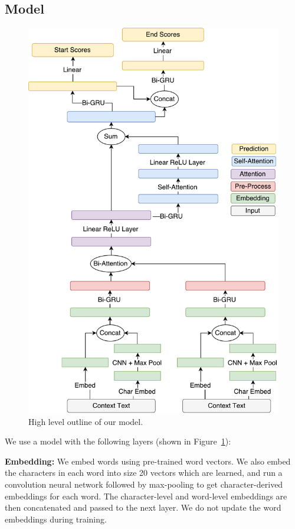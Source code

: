 \documentclass[11pt,a4paper]{article}
\begin{document}
\subsection{Model}
\begin{figure}[!ht]
\center
\includegraphics[width=\columnwidth]{figures/model-cropped.pdf}

\caption{High level outline of our model.}
\label{fig:model_outline}
\end{figure}
We use a model with the following layers (shown in Figure~\ref{fig:model_outline}):

\textbf{Embedding:}
We embed words using pre-trained word vectors. We also embed the characters in each word into size 20 vectors which are learned, and run a convolution neural network followed by max-pooling to get character-derived embeddings for each word. The character-level and word-level embeddings are then concatenated and passed to the next layer. We do not update the word embeddings during training.
\end{document}
